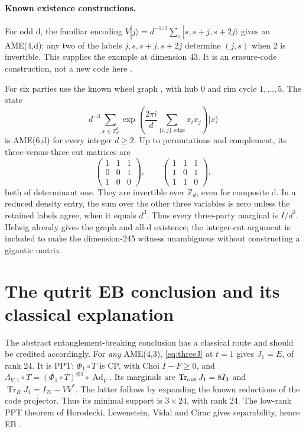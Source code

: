 \documentclass[11pt,a4paper]{article}
\newcommand{\Tr}{\operatorname{Tr}}
\begin{document}
\paragraph{Known existence constructions.}
For odd d, the familiar encoding
\(V|j\rangle=d^{-1/2}\sum_s|s,s+j,s+2j\rangle\)
gives an AME(4,d): any two of the labels \(j,s,s+j,s+2j\) determine \((j,s)\) when 2 is invertible. This supplies the example at dimension 43. It is an erasure-code construction, not a new code here \cite{CGL,Helwig}.

For six parties use the known wheel graph \cite{Graph}, with hub 0 and rim cycle \(1,\ldots,5\). The state
\[
 d^{-3}\sum_{x\in\mathbb Z_d^6}
  \exp\left(\frac{2\pi i}{d}\sum_{\{i,j\}\text{ edge}}x_ix_j\right)|x\rangle
\]
is AME(6,d) for every integer \(d\ge2\). Up to permutations and complement, its three-versus-three cut matrices are
\[
 \begin{pmatrix}1&1&1\\0&0&1\\1&0&0\end{pmatrix},\qquad
 \begin{pmatrix}1&1&1\\1&0&1\\1&1&0\end{pmatrix},
\]
both of determinant one. They are invertible over \(\mathbb Z_d\), even for composite d. In a reduced density entry, the sum over the other three variables is zero unless the retained labels agree, when it equals \(d^3\). Thus every three-party marginal is \(I/d^3\). Helwig already gives the graph and all-d existence; the integer-cut argument is included to make the dimension-245 witness unambiguous without constructing a gigantic matrix.

\section{The qutrit EB conclusion and its classical explanation}
The abstract entanglement-breaking conclusion has a classical route and should be credited accordingly. For \emph{any} AME(4,3), \eqref{eq:threeJ} at \(t=1\) gives \(J_1=E\), of rank 24. It is PPT: \(\Phi_1\circ T\) is CP, with Choi \(I-F\ge0\), and
\(\Lambda_{V,1}\circ T=(\Phi_1\circ T)^{\otimes3}\circ\operatorname{Ad}_{\overline V}\).
Its marginals are \(\Tr_{\rm out}J_1=8I_3\) and \(\Tr_RJ_1=I_{27}-VV^*\). The latter follows by expanding the known reductions of the code projector. Thus its minimal support is \(3\times24\), with rank 24. The low-rank PPT theorem of Horodecki, Lewenstein, Vidal and Cirac \cite{HLVC} gives separability, hence EB \cite{HSR}.
\end{document}
